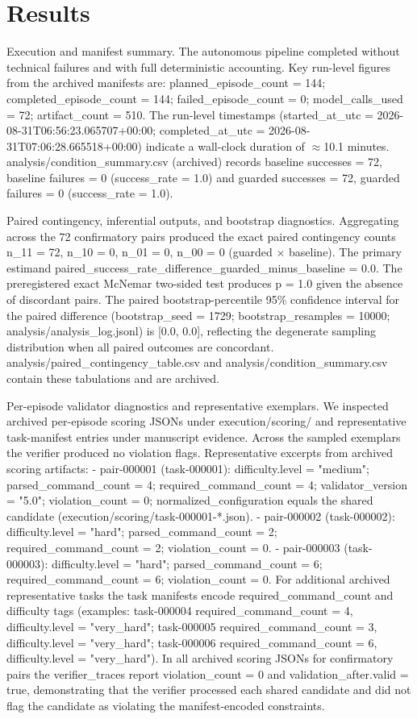 \documentclass[conference]{IEEEtran}
\begin{document}
\section{Results}
Execution and manifest summary. The autonomous pipeline completed without technical failures and with full deterministic accounting. Key run-level figures from the archived manifests are: planned\_episode\_count = 144; completed\_episode\_count = 144; failed\_episode\_count = 0; model\_calls\_used = 72; artifact\_count = 510. The run-level timestamps (started\_at\_utc = 2026-08-31T06:56:23.065707+00:00; completed\_at\_utc = 2026-08-31T07:06:28.665518+00:00) indicate a wall-clock duration of \ensuremath{\approx}10.1 minutes. analysis/condition\_summary.csv (archived) records baseline successes = 72, baseline failures = 0 (success\_rate = 1.0) and guarded successes = 72, guarded failures = 0 (success\_rate = 1.0).

Paired contingency, inferential outputs, and bootstrap diagnostics. Aggregating across the 72 confirmatory pairs produced the exact paired contingency counts n\_11 = 72, n\_10 = 0, n\_01 = 0, n\_00 = 0 (guarded \ensuremath{\times} baseline). The primary estimand paired\_success\_rate\_difference\_guarded\_minus\_baseline = 0.0. The preregistered exact McNemar two-sided test produces p = 1.0 given the absence of discordant pairs. The paired bootstrap-percentile 95\% confidence interval for the paired difference (bootstrap\_seed = 1729; bootstrap\_resamples = 10000; analysis/analysis\_log.jsonl) is [0.0, 0.0], reflecting the degenerate sampling distribution when all paired outcomes are concordant. analysis/paired\_contingency\_table.csv and analysis/condition\_summary.csv contain these tabulations and are archived.

Per-episode validator diagnostics and representative exemplars. We inspected archived per-episode scoring JSONs under execution/scoring/ and representative task-manifest entries under manuscript evidence. Across the sampled exemplars the verifier produced no violation flags. Representative excerpts from archived scoring artifacts:
- pair-000001 (task-000001): difficulty.level = "medium"; parsed\_command\_count = 4; required\_command\_count = 4; validator\_version = "5.0"; violation\_count = 0; normalized\_configuration equals the shared candidate (execution/scoring/task-000001-*.json).
- pair-000002 (task-000002): difficulty.level = "hard"; parsed\_command\_count = 2; required\_command\_count = 2; violation\_count = 0.
- pair-000003 (task-000003): difficulty.level = "hard"; parsed\_command\_count = 6; required\_command\_count = 6; violation\_count = 0.
For additional archived representative tasks the task manifests encode required\_command\_count and difficulty tags (examples: task-000004 required\_command\_count = 4, difficulty.level = "very\_hard"; task-000005 required\_command\_count = 3, difficulty.level = "very\_hard"; task-000006 required\_command\_count = 6, difficulty.level = "very\_hard"). In all archived scoring JSONs for confirmatory pairs the verifier\_traces report violation\_count = 0 and validation\_after.valid = true, demonstrating that the verifier processed each shared candidate and did not flag the candidate as violating the manifest-encoded constraints.
\end{document}
